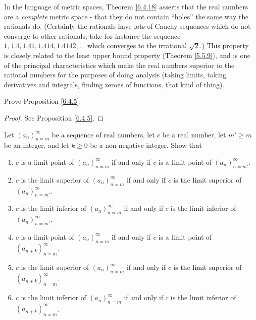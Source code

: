 \begin{remark}\label{6.4.20}
    In the language of metric spaces, Theorem \ref{6.4.18} asserts that the real numbers are a \emph{complete} metric space
    - that they do not contain ``holes'' the same way the rationals do.
    (Certainly the rationals have lots of Cauchy sequences which do not converge to other rationals;
    take for instance the sequence \(1, 1.4, 1.41, 1.414, 1.4142, \dots\) which converges to the irrational \(\sqrt{2}\).)
    This property is closely related to the least upper bound property (Theorem \ref{5.5.9}), and is one of the principal characteristics which make the real numbers superior to the rational numbers for the purposes of doing analysis
    (taking limits, taking derivatives and integrals, finding zeroes of functions, that kind of thing).
\end{remark}

\exercisesection

\begin{exercise}\label{ex 6.4.1}
    Prove Proposition \ref{6.4.5}.
\end{exercise}

\begin{proof}
    See Proposition \ref{6.4.5}.
\end{proof}

\begin{exercise}\label{ex 6.4.2}
    Let \((a_n)_{n = m}^\infty\) be a sequence of real numbers, let \(c\) be a real number, let \(m' \geq m\) be an integer, and let \(k \geq 0\) be a non-negative integer.
    Show that
    \begin{enumerate}
        \item \(c\) is a limit point of \((a_n)_{n = m}^\infty\) if and only if \(c\) is a limit point of \((a_n)_{n = m'}^\infty\).
        \item \(c\) is the limit superior of \((a_n)_{n = m}^\infty\) if and only if \(c\) is the limit superior of \((a_n)_{n = m'}^\infty\).
        \item \(c\) is the limit inferior of \((a_n)_{n = m}^\infty\) if and only if \(c\) is the limit inferior of \((a_n)_{n = m'}^\infty\).
        \item \(c\) is a limit point of \((a_n)_{n = m}^\infty\) if and only if \(c\) is a limit point of \((a_{n + k})_{n = m}^\infty\).
        \item \(c\) is the limit superior of \((a_n)_{n = m}^\infty\) if and only if \(c\) is the limit superior of \((a_{n + k})_{n = m}^\infty\).
        \item \(c\) is the limit inferior of \((a_n)_{n = m}^\infty\) if and only if \(c\) is the limit inferior of \((a_{n + k})_{n = m}^\infty\).
    \end{enumerate}
\end{exercise}

